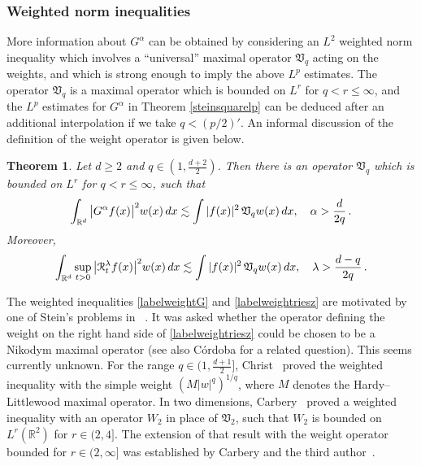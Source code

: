 \documentclass[11pt]{amsart}
\newtheorem{theorem}{Theorem}[section]
\theoremstyle{definition}
\numberwithin{theorem}{section}
\numberwithin{definition}{section}
\newcommand{\note}[1]{\footnote{\texttt{\Small #1}}}
\def\lc{\lesssim}
\def\fV{{\mathfrak {V}}}
\def\bbR{{\mathbb {R}}}
\begin{document}
\subsubsection*{\bf Weighted norm inequalities}
More information about $G^\alpha$ can be obtained by considering
an $L^2$ weighted norm inequality which involves  a
``universal'' maximal  operator $\fV_q$ acting on the weights, and
 which is strong enough to imply the above $L^p$ estimates.
The operator $\fV_q$  is a maximal operator which
is bounded on $L^r$ for $q<r\le \infty$,
and the  $L^p$ estimates  for $G^\alpha$ in Theorem
\ref{steinsquarelp} can be deduced after an additional interpolation
 if we take  $q<(p/2)'$. An informal discussion of the definition of the
weight operator is given below.


\begin{theorem}\label{rieszweighted}
 Let $d\ge 2$ and $q\in (1,\frac{d+2}{2})$.
Then there is  an operator
$\fV_q$  which is
bounded on $L^r$ for $q<r\le \infty$, such that
\begin{equation}\label{labelweightG}
\int_{\bbR^d}
  \big|G^\alpha f(x)\big|^2 w(x)\,dx
\lc \int |f(x)|^2\, \frak V_q w(x)\, dx, \quad \alpha>\frac{d}{2q}\,.
\end{equation}
Moreover,
\begin{equation}\label{labelweightriesz}
\int_{\bbR^d}
 \sup_{t>0}  \big|\mathcal R^\lambda_t  f(x)\big|^2 w(x)\,dx
\lc \int |f(x)|^2\, \frak V_q w(x)\, dx, \quad
\lambda>\frac{d-q}{2q}\,.
\end{equation}
\end{theorem}


The weighted inequalities
\eqref{labelweightG} and \eqref{labelweightriesz}
are motivated by  one of Stein's
problems in ~\cite{st}. It was asked  whether the operator  defining the
weight on the right hand side of \eqref{labelweightriesz}
could  be chosen to be   a  Nikodym maximal
operator (see also C\'ordoba \cite{co0} for a related question).
This seems currently unknown.
For the range $q\in(1,\frac{d+1}2]$,
Christ~\cite{ch} proved the weighted inequality with the  simple
weight $(M|w|^q)^{1/q}$, where  $M$ denotes the Hardy--Littlewood
maximal operator. In two dimensions, Carbery~\cite{ca2} proved a
weighted inequality with an  operator $W_2$ in place of $\fV_2$,
such that $W_2$ is bounded on $L^r(\bbR^2)$ for $r\in (2,4]$.
 The extension of that
result  with the weight operator  bounded for
$r\in (2,\infty]$ was established by Carbery
and the third author~\cite{case}.
\end{document}
